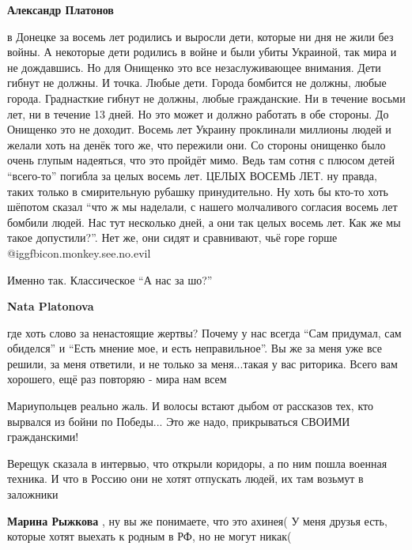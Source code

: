 \begin{itemize}
\begin{itemize}
\textbf{Александр Платонов} 

в Донецке за восемь лет родились и выросли дети, которые ни дня не жили без
войны. А некоторые дети родились в войне и были убиты Украиной, так мира и не
дождавшись. Но для Онищенко это все незаслуживающее внимания. Дети гибнут не
должны. И точка. Любые дети. Города бомбится не должны, любые города.
Граднасткие гибнут не должны, любые гражданские. Ни в течение восьми лет, ни в
течение 13 дней. Но это может и должно работать в обе стороны. До Онищенко это
не доходит. Восемь лет Украину проклинали миллионы людей и желали хоть на денёк
того же, что пережили они. Со стороны онищенко было очень глупым надеяться, что
это пройдёт мимо. Ведь там сотня с плюсом детей \enquote{всего-то} погибла за целых
восемь лет. ЦЕЛЫХ ВОСЕМЬ ЛЕТ. ну правда, таких только в смирительную рубашку
принудительно. Ну хоть бы кто-то хоть шёпотом сказал \enquote{что ж мы наделали, с
нашего молчаливого согласия восемь лет бомбили людей. Нас тут несколько дней, а
они так целых восемь лет. Как же мы такое допустили?}. Нет же, они сидят и
сравнивают, чьё горе горше  @igg{fbicon.monkey.see.no.evil} 


Именно так. Классическое \enquote{А нас за шо?}

\textbf{Nata Platonova} 

где хоть слово за ненастоящие жертвы? Почему у нас всегда \enquote{Сам придумал, сам
обиделся} и \enquote{Есть мнение мое, и есть неправильное}. Вы же за меня уже все
решили, за меня ответили, и не только за меня...такая у вас риторика. Всего вам
хорошего, ещё раз повторяю - мира нам всем

\end{itemize} %


Мариупольцев реально жаль. И волосы встают дыбом от рассказов тех, кто вырвался
из бойни по Победы... Это же надо, прикрываться СВОИМИ гражданскими!



Верещук сказала в интервью, что открыли коридоры, а по ним пошла военная
техника. И что в Россию они не хотят отпускать людей, их там возьмут в
заложники

\begin{itemize} %
\textbf{Марина Рыжкова} , ну вы же понимаете, что это ахинея( У меня друзья есть, которые хотят выехать к родным в РФ, но не могут никак(


\end{itemize}
\end{itemize}

